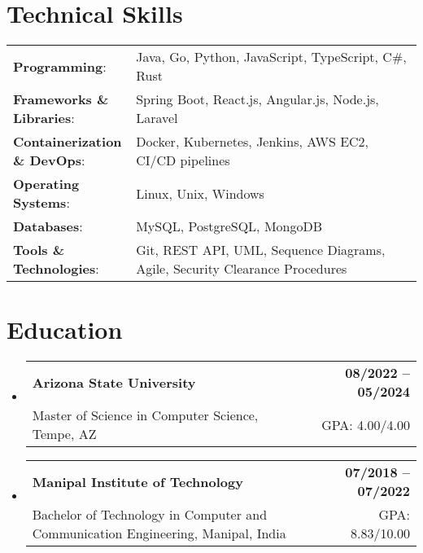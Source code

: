\documentclass[letterpaper,11pt]{article}
\makeatletter
\newcommand{\educationSubheading}[4]{
  \vspace{-2pt}\item
    \begin{tabular*}{1.0\textwidth}[t]{l@{\extracolsep{\fill}}r}
      \textbf{\small #1} & \textbf{\small #2} \\
      {\small#3} & {\small #4} \\
    \end{tabular*}\vspace{-7pt}
}
\newcommand{\resumeSubHeadingListStart}{\begin{itemize}[leftmargin=0pt, label={}]}
\newcommand{\resumeSubHeadingListEnd}{\end{itemize}}
\makeatother
\begin{document}
\section{Technical Skills}
        \vspace{-14pt}
        \begin{table}[h]
            \footnotesize
            \begin{tabular}{p{0.3\linewidth} p{0.7\linewidth}}
                \textbf{Programming}: & Java, Go, Python, JavaScript, TypeScript, C\#, Rust \\
                \textbf{Frameworks \& Libraries}: & Spring Boot, React.js, Angular.js, Node.js, Laravel \\
                \textbf{Containerization \& DevOps}: & Docker, Kubernetes, Jenkins, AWS EC2, CI/CD pipelines \\
                \textbf{Operating Systems}: & Linux, Unix, Windows \\
                \textbf{Databases}: & MySQL, PostgreSQL, MongoDB \\
                \textbf{Tools \& Technologies}: & Git, REST API, UML, Sequence Diagrams, Agile, Security Clearance Procedures \\
            \end{tabular}
        \end{table}

 \vspace{-15pt}

\section{Education}
  \resumeSubHeadingListStart
    \educationSubheading
      {Arizona State University}{08/2022 -- 05/2024}
      {Master of Science in Computer Science, Tempe, AZ}{GPA: 4.00/4.00}

    \educationSubheading
      {Manipal Institute of Technology}{07/2018 -- 07/2022}
      {Bachelor of Technology in Computer and Communication Engineering, Manipal, India}{GPA: 8.83/10.00}
  \resumeSubHeadingListEnd
\end{document}
